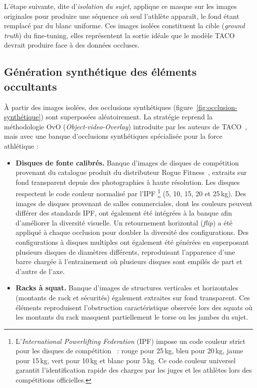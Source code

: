 L'étape suivante, dite d'\emph{isolation du sujet}, applique ce masque sur les images originales pour produire une séquence où seul l'athlète apparaît, le fond étant remplacé par du blanc uniforme. Ces images isolées constituent la cible (\emph{ground truth}) du fine-tuning, elles représentent la sortie idéale que le modèle TACO devrait produire face à des données occluses.

\subsection{Génération synthétique des éléments occultants}

À partir des images isolées, des occlusions synthétiques (figure~\ref{fig:occlusion-synthétique}) sont superposées aléatoirement. La stratégie reprend la méthodologie OvO (\emph{Object-video-Overlay}) introduite par les auteurs de TACO~\cite{TACO-2025}, mais avec une banque d'occlusions synthétiques spécialisée pour la force athlétique :

\begin{itemize}
  \item \textbf{Disques de fonte calibrés.} Banque d'images de disques de compétition provenant du catalogue produit du distributeur Rogue Fitness~\cite{Rogue-Fitness-Plates}, extraits sur fond transparent depuis des photographies à haute résolution. Les disques respectent le code couleur normalisé par l'IPF \footnote{L'\textit{International Powerlifting Federation} (IPF) impose un code couleur strict pour les disques de compétition~\cite{IPF-Technical-Regulations-2025} : rouge pour 25\,kg, bleu pour 20\,kg, jaune pour 15\,kg, vert pour 10\,kg et blanc pour 5\,kg. Ce code couleur universel garantit l'identification rapide des charges par les juges et les athlètes lors des compétitions officielles.} (5, 10, 15, 20 et 25\,kg). Des images de disques provenant de salles commerciales, dont les couleurs peuvent différer des standards IPF, ont également été intégrées à la banque afin d'améliorer la diversité visuelle. Un retournement horizontal (\textit{flip}) a été appliqué à chaque occlusion pour doubler la diversité des configurations. Des configurations à disques multiples ont également été générées en superposant plusieurs disques de diamètres différents, reproduisant l'apparence d'une barre chargée à l'entrainement où plusieurs disques sont empilés de part et d'autre de l'axe.
  \item \textbf{Racks à squat.} Banque d'images de structures verticales et horizontales (montants de rack et sécurités) également extraites sur fond transparent. Ces éléments reproduisent l'obstruction caractéristique observée lors des squats où les montants du rack masquent partiellement le torse ou les jambes du sujet.
\end{itemize}

